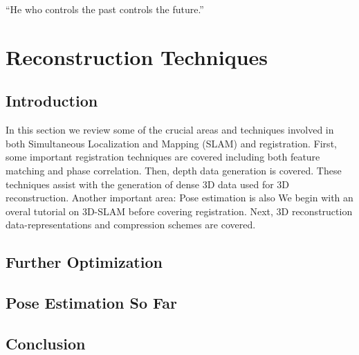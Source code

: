 \begin{savequote}[8cm]
  ``He who controls the past controls the future.''
\end{savequote}
\makeatletter
\chapter{Reconstruction Techniques}

\section{Introduction}

In this section we review some of the crucial areas and techniques involved in both Simultaneous Localization and Mapping (SLAM) and registration. First, some important registration techniques are covered including both feature matching and phase correlation. Then, depth data generation is covered. These techniques assist with the generation of dense 3D data used for 3D reconstruction. Another important area: Pose estimation is also We begin with an overal tutorial on 3D-SLAM before covering registration. Next, 3D reconstruction data-representations and compression schemes are covered. 


\section{Further Optimization}


\section{Pose Estimation So Far}



\section{Conclusion}

